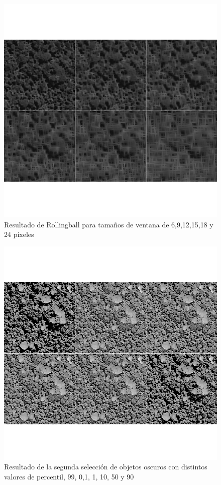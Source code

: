 \begin{figure}[h!]
    \includegraphics[width=\textwidth]{Imagenes/Resultados script morfologico/GS04.png}
     \hfill
     \caption{Resultado de Rollingball para tamaños de ventana de 6,9,12,15,18 y 24 píxeles}
    \label{Rollingball}
\end{figure}

\begin{figure}[h!]
    \includegraphics[width=\textwidth]{Imagenes/Resultados script morfologico/GS06.png}
     \hfill
     \caption{Resultado de la segunda selección de objetos oscuros con distintos valores de percentil, 99, 0,1, 1, 10, 50 y 90 }
    \label{segundaoscuros}
\end{figure}

